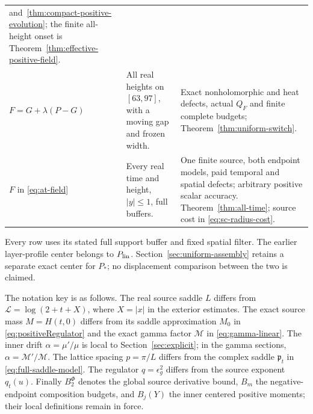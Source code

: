 \begin{longtable}{@{}>{\raggedright\arraybackslash}p{}>{\raggedright\arraybackslash}p{}>{\raggedright\arraybackslash}p{}@{}}
and~\ref{thm:compact-positive-evolution}; the finite all-height
onset is Theorem~\ref{thm:effective-positive-field}.\\
$F=G+\lambda(P-G)$ & All real heights on $[63,97]$, with a moving
gap and frozen width. & Exact nonholomorphic and heat defects, actual
$Q_F$ and finite complete budgets; Theorem~\ref{thm:uniform-switch}.\\
$F$ in \eqref{eq:at-field} & Every real time and height,
$|y|\le1$, full buffers. & One finite source, both endpoint models,
paid temporal and spatial defects; arbitrary positive scalar accuracy.
Theorem~\ref{thm:all-time}; source cost in
\eqref{eq:sc-radius-cost}.\\
\bottomrule
\end{longtable}
\endgroup
Every row uses its stated full support buffer and fixed spatial filter.
The earlier layer-profile center belongs to $P_{\rm lin}$.
Section~\ref{sec:uniform-assembly} retains a separate exact center for
$P_*$; no displacement comparison between the two is claimed.

The notation key is as follows. The real source saddle $L$ differs from
$\mathcal L=\log(2+t+X)$, where $X=|x|$ in the exterior estimates.
The exact source mass $M=H(t,0)$ differs from its saddle approximation
$M_0$ in \eqref{eq:positiveRegulator} and the exact gamma factor
$\mathcal M$ in \eqref{eq:gamma-linear}.
The inner drift $\alpha=\mu'/\mu$ is local to
Section~\ref{sec:explicit}; in the gamma sections,
$\alpha=\mathcal M'/\mathcal M$. The lattice spacing $p=\pi/L$
differs from the complex saddle $\mathfrak p_t$ in
\eqref{eq:full-saddle-model}.
The regulator $q=\epsilon_g^2$ differs from the source exponent $q_t(u)$.
Finally $B_2^{\Phi}$ denotes the global source derivative bound, $B_m$
the negative-endpoint composition budgets, and $B_j(Y)$ the inner
centered positive moments; their local definitions remain in force.
